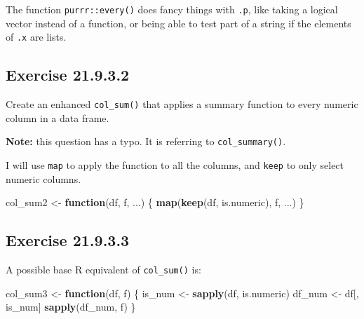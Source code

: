 \documentclass[]{book}
\newenvironment{Shaded}{\begin{snugshade}}{\end{snugshade}}
\newcommand{\CommentTok}[1]{\textcolor[rgb]{0.56,0.35,0.01}{\textit{#1}}}
\newcommand{\ControlFlowTok}[1]{\textcolor[rgb]{0.13,0.29,0.53}{\textbf{#1}}}
\newcommand{\KeywordTok}[1]{\textcolor[rgb]{0.13,0.29,0.53}{\textbf{#1}}}
\newcommand{\NormalTok}[1]{#1}
\newcommand{\StringTok}[1]{\textcolor[rgb]{0.31,0.60,0.02}{#1}}
\theoremstyle{plain}
\theoremstyle{remark}
\begin{document}
The function \texttt{purrr::every()} does fancy things with \texttt{.p}, like taking a logical vector instead of a function, or being able to test part of a string if the elements of \texttt{.x} are lists.

\hypertarget{exercise-21.9.3.2}{%
\subsection*{\texorpdfstring{Exercise {21.9.3.2}}{Exercise 21.9.3.2}}\label{exercise-21.9.3.2}}

Create an enhanced \texttt{col\_sum()} that applies a summary function to every numeric column in a data frame.

\textbf{Note:} this question has a typo. It is referring to \texttt{col\_summary()}.

I will use \texttt{map} to apply the function to all the columns, and \texttt{keep} to only select numeric columns.

\begin{Shaded}
\begin{Highlighting}[]
\NormalTok{col_sum2 <-}\StringTok{ }\ControlFlowTok{function}\NormalTok{(df, f, ...) \{}
  \KeywordTok{map}\NormalTok{(}\KeywordTok{keep}\NormalTok{(df, is.numeric), f, ...)}
\NormalTok{\}}
\end{Highlighting}
\end{Shaded}

\begin{Shaded}
\end{Shaded}

\hypertarget{exercise-21.9.3.3}{%
\subsection*{\texorpdfstring{Exercise {21.9.3.3}}{Exercise 21.9.3.3}}\label{exercise-21.9.3.3}}

A possible base R equivalent of \texttt{col\_sum()} is:

\begin{Shaded}
\begin{Highlighting}[]
\NormalTok{col_sum3 <-}\StringTok{ }\ControlFlowTok{function}\NormalTok{(df, f) \{}
\NormalTok{  is_num <-}\StringTok{ }\KeywordTok{sapply}\NormalTok{(df, is.numeric)}
\NormalTok{  df_num <-}\StringTok{ }\NormalTok{df[, is_num]}
  \KeywordTok{sapply}\NormalTok{(df_num, f)}
\NormalTok{\}}
\end{Highlighting}
\end{Shaded}
\end{document}
